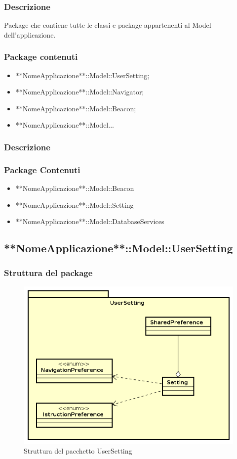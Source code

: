 \documentclass[../SpecificaTecnica.tex]{subfiles}
\begin{document}
		\subsubsection{Descrizione}
			Package che contiene tutte le classi e package appartenenti al Model dell'applicazione.
		\subsubsection{Package contenuti}
			\begin{itemize}
				\item **NomeApplicazione**::Model::UserSetting;
				\item **NomeApplicazione**::Model::Navigator;
				\item **NomeApplicazione**::Model::Beacon;
				\item **NomeApplicazione**::Model...
			\end{itemize}
		\subsubsection{Descrizione}
		\subsubsection{Package Contenuti}
			\begin{itemize}
				\item **NomeApplicazione**::Model::Beacon
				\item **NomeApplicazione**::Model::Setting
				\item **NomeApplicazione**::Model::DatabaseServices
			\end{itemize}
			\newpage
	\subsection{**NomeApplicazione**::Model::UserSetting}
		\subsubsection{Struttura del package}
			\begin{figure}[!h]
				\centering
				\includegraphics[scale=0.6]{diagrammi/UserSetting.png}
					\caption{Struttura del pacchetto UserSetting}
				\label{fig:Struttura_MVP}
			\end{figure} 
\end{document}
